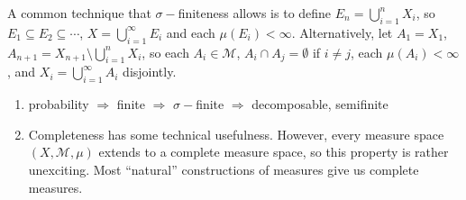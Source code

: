 \documentclass[12pt, a4paper]{memoir}
\theoremstyle{nonumberplain}
\begin{document}
A common technique that $\sigma-$finiteness allows is to define $E_n=\bigcup_{i=1}^n X_i$, so $E_1\subseteq E_2\subseteq\cdots$, $X=\bigcup_{i=1}^\infty E_i$ and each $\mu(E_i)<\infty$.
Alternatively, let $A_1=X_1$, $A_{n+1}=X_{n+1}\setminus\bigcup_{i=1}^n X_i$, so each $A_i\in\mathcal{M}$, $A_i\cap A_j=\emptyset$ if $i\neq j$, each $\mu(A_i)<\infty$, and $X_i=\bigcup_{i=1}^\infty A_i$ disjointly.
\begin{enumerate}
    \item probability $\Rightarrow$ finite $\Rightarrow$ $\sigma-$finite $\Rightarrow$ decomposable, semifinite
    \item Completeness has some technical usefulness.
        However, every measure space $(X,\mathcal{M},\mu)$ extends to a complete measure space, so this property is rather unexciting.
        Most ``natural'' constructions of measures give us complete measures.
\end{enumerate}
\end{document}
